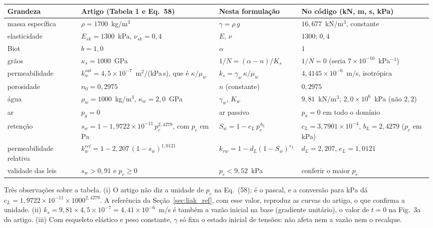 \documentclass[11pt,a4paper]{article}
\begin{document}
\begin{center}\small
\begin{tabularx}{\textwidth}{@{}>{\raggedright\arraybackslash}p{2.6cm}
                             >{\raggedright\arraybackslash}p{4.6cm}
                             >{\raggedright\arraybackslash}p{2.9cm} X@{}}
\toprule
Grandeza & Artigo (Tabela 1 e Eq.~58) & Nesta formulação & No código (kN, m, s, kPa)\\
\midrule
massa específica & $\rho=1700$~kg/m$^3$ & $\gamma=\rho\,g$ & $16{,}677$~kN/m$^3$, constante\\
elasticidade & $E_{sk}=1300$~kPa, $\nu_{sk}=0{,}4$ & $E$, $\nu$ & $1300$; $0{,}4$\\
Biot & $b=1{,}0$ & $\alpha$ & $1$\\
grãos & $\kappa_s=1000$~GPa & $1/N=(\alpha-n)/K_s$ & $1/N=0$ (seria $7\times10^{-10}$~kPa$^{-1}$)\\
permeabilidade & $k_w^{sat}=4{,}5\times10^{-7}$~m$^2$/(kPa\,s), que é $\kappa/\mu_w$ & $k_s=\gamma_w\,\kappa/\mu_w$ & $4{,}4145\times10^{-6}$~m/s, isotrópica\\
porosidade & $n_0=0{,}2975$ & $n$ (constante) & $0{,}2975$\\
água & $\rho_w=1000$~kg/m$^3$, $\kappa_w=2{,}0$~GPa & $\gamma_w$, $K_w$ & $9{,}81$~kN/m$^3$; $2{,}0\times10^{6}$~kPa (não $2{,}2$)\\
ar & $p_g=0$ & ar passivo & $p_a=0$ em todo o domínio\\
retenção & $s_w=1-1{,}9722\times10^{-11}\,p_c^{2{,}4279}$, com $p_c$ em Pa & $S_w=1-c_L\,p_c^{\,b_L}$ & $c_L=3{,}7901\times10^{-4}$, $b_L=2{,}4279$ ($p_c$ em kPa)\\
permeabilidade relativa & $k_w^{rel}=1-2{,}207\,(1-s_w)^{1{,}0121}$ & $k_{rw}=1-d_L(1-S_w)^{e_L}$ & $d_L=2{,}207$, $e_L=1{,}0121$\\
validade das leis & $s_w>0{,}91$ e $p_c\ge0$ & $p_c<9{,}52$~kPa & conferir o maior $p_c$\\
\bottomrule
\end{tabularx}
\end{center}

Três observações sobre a tabela. (i) O artigo não diz a unidade de $p_c$ na Eq.~(58); é o
pascal, e a conversão para kPa dá $c_L=1{,}9722\times10^{-11}\times1000^{2{,}4279}$. A
referência da Seção~\ref{sec:liak_ref}, com esse valor, reproduz as curvas do artigo, o que
confirma a unidade. (ii) $k_s=9{,}81\times4{,}5\times10^{-7}=4{,}41\times10^{-6}$~m/s é
também a vazão inicial na base (gradiente unitário), o valor de $t=0$ na Fig.~3a do artigo.
(iii) Com esqueleto elástico e peso constante, $\gamma$ só fixa o estado inicial de tensões:
não afeta nem a vazão nem o recalque.
\end{document}
